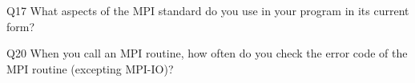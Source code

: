 \begin{description}%
\item{Q17} What aspects of the MPI standard do you use in your program in its current form?%
\item{Q20} When you call an MPI routine, how often do you check the error code of the MPI routine  (excepting MPI-IO)?%
\end{description}%
